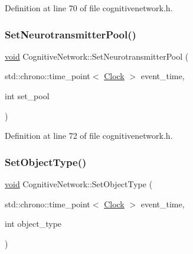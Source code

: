 Definition at line 70 of file cognitivenetwork.\+h.

\mbox{\label{class_cognitive_network_a84f808251f67ced0edad2e1dd4d47039}} 
\subsubsection{\texorpdfstring{Set\+Neurotransmitter\+Pool()}{SetNeurotransmitterPool()}}
{\footnotesize\ttfamily \mbox{\hyperlink{glad_8h_a950fc91edb4504f62f1c577bf4727c29}{void}} Cognitive\+Network\+::\+Set\+Neurotransmitter\+Pool (\begin{DoxyParamCaption}\item[{std\+::chrono\+::time\+\_\+point$<$ \mbox{\hyperlink{universe_8h_a0ef8d951d1ca5ab3cfaf7ab4c7a6fd80}{Clock}} $>$}]{event\+\_\+time,  }\item[{int}]{set\+\_\+pool }\end{DoxyParamCaption})\hspace{0.3cm}{\ttfamily [inline]}}



Definition at line 72 of file cognitivenetwork.\+h.

\mbox{\label{class_cognitive_network_ad95a0b25c7f61fc52322938eb13c9e3e}} 
\subsubsection{\texorpdfstring{Set\+Object\+Type()}{SetObjectType()}}
{\footnotesize\ttfamily \mbox{\hyperlink{glad_8h_a950fc91edb4504f62f1c577bf4727c29}{void}} Cognitive\+Network\+::\+Set\+Object\+Type (\begin{DoxyParamCaption}\item[{std\+::chrono\+::time\+\_\+point$<$ \mbox{\hyperlink{universe_8h_a0ef8d951d1ca5ab3cfaf7ab4c7a6fd80}{Clock}} $>$}]{event\+\_\+time,  }\item[{int}]{object\+\_\+type }\end{DoxyParamCaption})}



